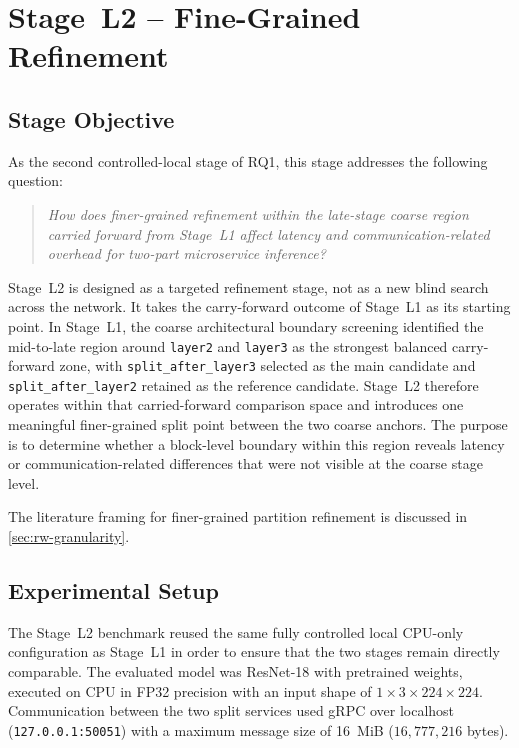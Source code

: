\section{Stage~L2 -- Fine-Grained Refinement}
\label{sec:rq12}

\subsection{Stage Objective}

As the second controlled-local stage of RQ1, this stage addresses the following question:

\begin{quote}
\textit{How does finer-grained refinement within the late-stage coarse region carried forward from Stage~L1 affect latency and communication-related overhead for two-part microservice inference?}
\end{quote}

Stage~L2 is designed as a targeted refinement stage, not as a new blind search across the network. It takes the carry-forward outcome of Stage~L1 as its starting point. In Stage~L1, the coarse architectural boundary screening identified the mid-to-late region around \texttt{layer2} and \texttt{layer3} as the strongest balanced carry-forward zone, with \texttt{split\_after\_layer3} selected as the main candidate and \texttt{split\_after\_layer2} retained as the reference candidate. Stage~L2 therefore operates within that carried-forward comparison space and introduces one meaningful finer-grained split point between the two coarse anchors. The purpose is to determine whether a block-level boundary within this region reveals latency or communication-related differences that were not visible at the coarse stage level.

The literature framing for finer-grained partition refinement is discussed in
\cref{sec:rw-granularity}.

\subsection{Experimental Setup}
\label{sec:rq12-setup}

The Stage~L2 benchmark reused the same fully controlled local CPU-only configuration as Stage~L1 in order to ensure that the two stages remain directly comparable. The evaluated model was ResNet-18 with pretrained weights, executed on CPU in FP32 precision with an input shape of $1 \times 3 \times 224 \times 224$. Communication between the two split services used gRPC over localhost (\texttt{127.0.0.1:50051}) with a maximum message size of 16~MiB ($16{,}777{,}216$ bytes).


